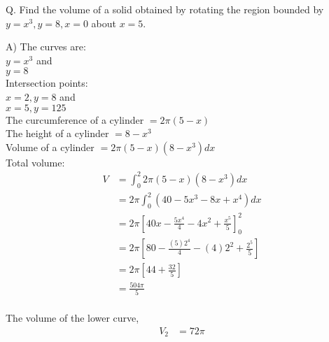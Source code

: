 \documentclass{article}
\newcounter{question}
\begin{document}
\newcommand\Que[1]{%
    \leavevmode\par
    \stepcounter{question}
    \noindent
    Q.\thequestion #1\par}

\newcommand\Ans[2][]{%
    \leavevmode\par\noindent
    {A) \textbf{#1}#2\par}}

\Que{
    Find the volume of a solid obtained by 
    rotating the region bounded by 
    $y=x^3, y=8, x=0$ about $x=5$.
    }
\Ans{
    The curves are:\\
    $y=x^3$ and\\
    $y=8$\\
    
    Intersection points:\\
    $x=2, y=8$ and\\
    $x=5, y=125$\\
    
    The curcumference of a cylinder
    $=2\pi(5-x)$\\

    The height of a cylinder
    $=8-x^3$\\

    Volume of a cylinder
    $=2\pi(5-x)(8-x^3)dx$\\

    Total volume:\\
    \begin{align}        
        V & = \int_0^2{2\pi(5-x)(8-x^3)} dx\\
        & = 2\pi \int_0^2{(40-5x^3-8x+x^4)} dx\\
        & = 2\pi \left[
            40x-\frac{5x^4}{4}-4x^2+\frac{x^5}{5}
        \right]_0^2\\
        & = 2\pi \left[
            80-\frac{(5)2^4}{4}-(4)2^2+\frac{2^5}{5}
        \right]\\
        & = 2\pi \left[
            44+\frac{32}{5}
        \right]\\
        & = \frac{504\pi}{5}\\
    \end{align}

    The volume of the lower curve,\\
    \begin{align}        
        V_2 & = 72\pi\\
    \end{align}
}
\end{document}
